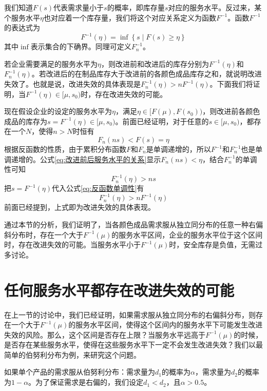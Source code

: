 我们知道$F(s)$代表需求量小于$s$的概率，即库存量$s$对应的服务水平。反过来，某个服务水平$\eta$也对应着一个库存量，我们将这个对应关系定义为函数$F^{-1}$。函数$F^{-1}$的表达式为
\[
F^{-1}(\eta) = \inf\left\{s\middle|F(s)\geq\eta\right\}
\]
其中$\inf$表示集合的下确界。同理可定义$F_n^{-1}$。

若企业需要满足的服务水平为$\eta$，则改进前和改进后的库存分别为$F^{-1}(\eta)$和$F_n^{-1}(\eta)$。若改进后的在制品库存大于改进前的各颜色成品库存之和，就说明改进失效了。也就是说，改进失效的具体表现是$F_n^{-1}(\eta)>nF^{-1}(\eta)$。下面我们将证明，当$F^{-1}(\eta)\in[\mu,s_0)$时，存在改进失效的可能。

现在假设企业的设定的服务水平为$\eta$，满足$\eta\in[F(\mu),F(s_0))$，则改进前各颜色成品的库存为$s=F^{-1}(\eta)\in[\mu,s_0)$。前面已经证明，对于任意的$s\in[\mu,s_0)$，都存在一个$N$，使得$n>N$时恒有
\begin{equation}
F_n(ns)<F(s)=\eta
\label{eq:改进前后服务水平的关系}
\end{equation}
根据反函数的性质，由于累积分布函数$F$和$F_n$是单调递增的，所以$F^{-1}$和$F_n^{-1}$也是单调递增的。公式\ref{eq:改进前后服务水平的关系}显示$F_n(ns)<\eta$，结合$F_n^{-1}$的单调性可知
\begin{equation}
F_n^{-1}(\eta) > ns
\label{eq:反函数单调性}
\end{equation}
把$s=F^{-1}(\eta)$代入公式\ref{eq:反函数单调性}有
\[
F_n^{-1}(\eta)>nF^{-1}(\eta)
\]
前面已经提到，上式即为改进失效的具体表现。

通过本节的分析，我们证明了，当各颜色成品需求服从独立同分布的任意一种右偏斜分布时，存在一个大于$F^{-1}(\mu)$的服务水平区间，企业的服务水平位于这个区间时，存在改进失效的可能。当服务水平小于$F^{-1}(\mu)$时，安全库存是负值，无需过多讨论。







\section{任何服务水平都存在改进失效的可能}

在上一节的讨论中，我们已经证明，如果需求服从独立同分布的右偏斜分布，则存在一个大于$F^{-1}(\mu)$的服务水平区间，使得这个区间内的服务水平下可能发生改进失效的风险。那么，这个区间是否存在上限？当服务水平远高于$F^{-1}(\mu)$的时候，是否存在某些服务水平，使得在这些服务水平下一定不会发生改进失效？我们以最简单的伯努利分布为例，来研究这个问题。

如果单个产品的需求服从伯努利分布：需求量为$d_1$的概率为$\alpha$，需求量为$d_2$的概率为$1-\alpha$。为了保证需求是右偏的，我们设定$d_1 < d_2$，且$\alpha > 0.5$。

